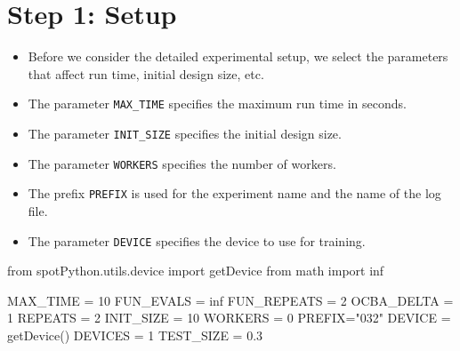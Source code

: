 \documentclass[
  letterpaper,
  DIV=11,
  numbers=noendperiod]{scrreprt}
\newenvironment{Shaded}{\begin{snugshade}}{\end{snugshade}}
\newcommand{\DecValTok}[1]{\textcolor[rgb]{0.68,0.00,0.00}{#1}}
\newcommand{\FloatTok}[1]{\textcolor[rgb]{0.68,0.00,0.00}{#1}}
\newcommand{\ImportTok}[1]{\textcolor[rgb]{0.00,0.46,0.62}{#1}}
\newcommand{\NormalTok}[1]{\textcolor[rgb]{0.00,0.23,0.31}{#1}}
\newcommand{\OperatorTok}[1]{\textcolor[rgb]{0.37,0.37,0.37}{#1}}
\newcommand{\StringTok}[1]{\textcolor[rgb]{0.13,0.47,0.30}{#1}}
\providecommand{\tightlist}{%
  \setlength{\itemsep}{0pt}\setlength{\parskip}{0pt}}\usepackage{longtable,booktabs,array}
\begin{document}
\section{Step 1: Setup}\label{sec-setup-33}

\begin{itemize}
\tightlist
\item
  Before we consider the detailed experimental setup, we select the
  parameters that affect run time, initial design size, etc.
\item
  The parameter \texttt{MAX\_TIME} specifies the maximum run time in
  seconds.
\item
  The parameter \texttt{INIT\_SIZE} specifies the initial design size.
\item
  The parameter \texttt{WORKERS} specifies the number of workers.
\item
  The prefix \texttt{PREFIX} is used for the experiment name and the
  name of the log file.
\item
  The parameter \texttt{DEVICE} specifies the device to use for
  training.
\end{itemize}

\begin{Shaded}
\begin{Highlighting}[]
\ImportTok{from}\NormalTok{ spotPython.utils.device }\ImportTok{import}\NormalTok{ getDevice}
\ImportTok{from}\NormalTok{ math }\ImportTok{import}\NormalTok{ inf}

\NormalTok{MAX\_TIME }\OperatorTok{=} \DecValTok{10}
\NormalTok{FUN\_EVALS }\OperatorTok{=}\NormalTok{ inf}
\NormalTok{FUN\_REPEATS }\OperatorTok{=} \DecValTok{2}
\NormalTok{OCBA\_DELTA }\OperatorTok{=} \DecValTok{1}
\NormalTok{REPEATS }\OperatorTok{=} \DecValTok{2}
\NormalTok{INIT\_SIZE }\OperatorTok{=} \DecValTok{10}
\NormalTok{WORKERS }\OperatorTok{=} \DecValTok{0}
\NormalTok{PREFIX}\OperatorTok{=}\StringTok{"032"}
\NormalTok{DEVICE }\OperatorTok{=}\NormalTok{ getDevice()}
\NormalTok{DEVICES }\OperatorTok{=} \DecValTok{1}
\NormalTok{TEST\_SIZE }\OperatorTok{=} \FloatTok{0.3}
\end{Highlighting}
\end{Shaded}
\end{document}

